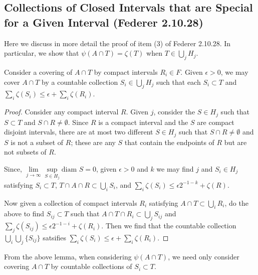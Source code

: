 \subsection{Collections of Closed Intervals that are Special for a Given Interval (Federer 2.10.28)}

Here we discuss in more detail the proof of item (3) of Federer 2.10.28. In particular, we show that 
\(\psi(A \cap T) = \zeta(T)\) when \(T \in \bigcup_j H_j\).

\begin{lemma}
Consider a covering of \(A \cap T\) by compact intervals \(R_i \in F\). Given \(\epsilon > 0\), we may
cover \(A \cap T\) by a countable collection \(S_i \in \bigcup_j H_j\) such that each \(S_i \subset T\) and
\(\sum_i \zeta(S_i) \leq \epsilon + \sum_i \zeta(R_i)\).
\end{lemma}
\begin{proof}
Consider any compact interval \(R\). Given \(j\), consider the
\(S \in H_j\) such that \(S \subset T\) and \(S \cap R \neq \emptyset\). Since \(R\) is a compact interval
and the \(S\) are compact disjoint intervals, there are at most
two different \(S \in H_j\) such that \(S \cap R \neq \emptyset\) and \(S\) is not a subset of \(R\); these
are any \(S\) that contain the endpoints of \(R\) but are not subsets of \(R\). 

Since, \(\lim\limits_{j\to \infty}\sup\limits_{S\in H_j} \text{diam } S = 0\), given \(\epsilon > 0\) and
\(k\) we may find \(j\) and \(S_i \in H_j\) satisfying \(S_i \subset T\),
\(T \cap A \cap R \subset \bigcup_i S_i\), and 
\(\sum_i \zeta(S_i) \leq \epsilon 2^{-1-k} + \zeta(R)\).

Now given a collection of compact intervals \(R_i\) satisfying \(A \cap T \subset \bigcup_i R_i\), do the above
to find \(S_{ij} \subset T\) such that \(A \cap T \cap R_i \subset \bigcup_j S_{ij}\) and
\(\sum_j \zeta(S_{ij}) \leq \epsilon 2^{-1 - i} + \zeta(R_i)\). Then we find that the countable collection
\(\bigcup_i \bigcup_j \{S_{ij}\}\) satsifies
\(\sum_i \zeta(S_i) \leq \epsilon + \sum_i \zeta(R_i)\). 
\end{proof}

From the above lemma, when considering \(\psi(A\cap T)\), we need only consider covering \(A \cap T\) by
countable collections of \(S_i \subset T\).

